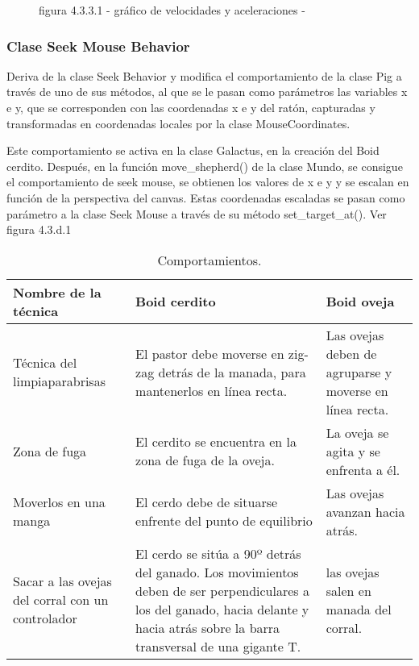 \begin{figure}[p]
figura 4.3.3.1
- gráfico de velocidades y aceleraciones -
\end{figure}


\subsubsection{Clase Seek Mouse Behavior}
\label{subsubsection:seek_mouse_behavior}

Deriva de la clase Seek Behavior y modifica el comportamiento de la clase Pig a través de uno de sus métodos, al que se le pasan 
como parámetros las variables x e y, que se corresponden  con las coordenadas x e y del ratón, capturadas y transformadas en coordenadas 
locales por la clase MouseCoordinates.

Este comportamiento se activa en la clase Galactus, en la creación del Boid cerdito. Después, en la función move\_shepherd() de la clase 
Mundo, se consigue el comportamiento de seek mouse, se obtienen los valores de x e y y se escalan en función de la perspectiva del canvas.
Estas coordenadas escaladas se pasan como parámetro a la clase Seek Mouse a través de su método  set\_target\_at(). Ver figura 4.3.d.1\\



\begin{table}[p]
\caption{Comportamientos.}
\begin{tabular}{| p{4cm} | p{7cm} | p{4cm} |} %

\hline\hline %
Nombre de la técnica & Boid cerdito & Boid oveja \\ [0.5ex] %
\hline %
Técnica del limpiaparabrisas & El pastor debe moverse en zig-zag detrás de la manada, para mantenerlos en línea recta. & Las ovejas deben de agruparse y moverse en línea recta.\\
Zona de fuga & El cerdito se encuentra en la zona de fuga de la oveja. & La oveja se agita y se enfrenta a él. \\
Moverlos en una manga & El cerdo debe de situarse enfrente del punto de equilibrio & Las ovejas avanzan hacia atrás. \\
Sacar a las ovejas del corral con un controlador & El cerdo se sitúa  a 90º detrás del ganado. Los movimientos deben de ser perpendiculares a los del ganado, hacia delante y hacia atrás sobre la barra transversal de una gigante T. & las ovejas salen en 
manada del corral. \\ [1ex] %
\hline %
\end{tabular}
\label{table:nonlin} %
\end{table}

